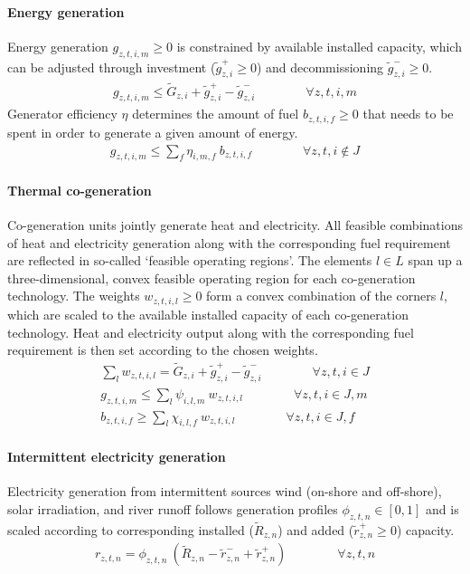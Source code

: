 \documentclass[11pt,a4paper]{article}
\begin{document}
\paragraph{Energy generation}
Energy generation $g_{z,t,i,m} \geq 0$ is constrained by available installed capacity, which can be adjusted through investment ($\widetilde{g}^{+}_{z,i} \geq 0$) and decommissioning $\widetilde{g}^{-}_{z,i} \geq 0$.
\begin{align}
g_{z,t,i,m} \leq \widetilde{G}_{z,i} + \widetilde{g}^{+}_{z,i} - \widetilde{g}^{-}_{z,i} \qquad \qquad \forall z,t,i,m
\end{align}
Generator efficiency $\eta$ determines the amount of fuel $b_{z,t,i,f} \geq 0$ that needs to be spent in order to generate a given amount of energy.
\begin{align}
g_{z,t,i,m} \leq \sum_{f} \eta_{i,m,f} \: b_{z,t,i,f} \qquad \qquad \forall z,t,i \notin J
\end{align}

\paragraph{Thermal co-generation}
Co-generation units jointly generate heat and electricity. All feasible combinations of heat and electricity generation along with the corresponding fuel requirement are reflected in so-called `feasible operating regions'. 
The elements $l \in L$ span up a three-dimensional, convex feasible operating region for each co-generation technology. 
The weights $w_{z,t,i,l} \geq 0$ form a convex combination of the corners $l$, which are scaled to the available installed capacity of each co-generation technology.
Heat and electricity output along with the corresponding fuel requirement is then set according to the chosen weights.
\begin{align}
\sum_{l} w_{z,t,i,l} = \widetilde{G}_{z,i} + \widetilde{g}^{+}_{z,i} - \widetilde{g}^{-}_{z,i} \qquad \qquad \forall z,t,i \in J \\
g_{z,t,i,m} \leq \sum_{l} \psi_{i,l,m} \: w_{z,t,i,l} \qquad \qquad \forall z,t,i \in J, m \\
b_{z,t,i,f} \geq \sum_{l} \chi_{i,l,f} \: w_{z,t,i,l} \qquad \qquad \forall z,t,i \in J, f
\end{align}

\paragraph{Intermittent electricity generation}
Electricity generation from intermittent sources wind (on-shore and off-shore), solar irradiation, and river runoff follows generation profiles $\phi_{z,t,n} \in [0,1]$ and is scaled according to corresponding installed ($ \widetilde{R}_{z,n}$) and added ($\widetilde{r}^{+}_{z,n} \geq 0$) capacity.
\begin{align}
r_{z,t,n} = \phi_{z,t,n} \: \left( \widetilde{R}_{z,n} - \widetilde{r}^{-}_{z,n} + \widetilde{r}^{+}_{z,n} \right) \qquad \qquad \forall z,t,n
\end{align}
\end{document}
